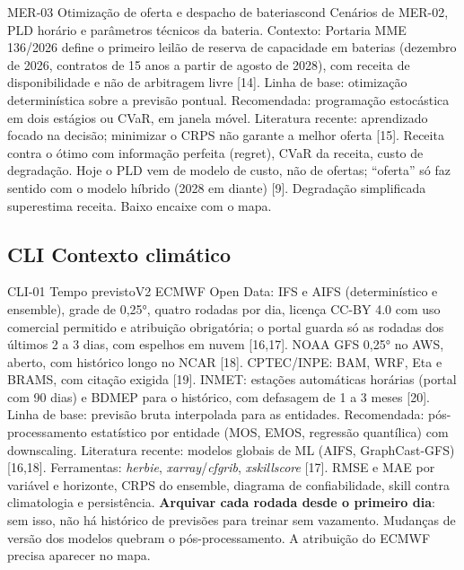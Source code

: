 \begin{ficha}{MER-03 \textperiodcentered{} Otimização de oferta e despacho de baterias}{cond}
 Cenários de MER-02, PLD horário e parâmetros técnicos da
bateria. Contexto: Portaria MME 136/2026 define o primeiro leilão de reserva
de capacidade em baterias (dezembro de 2026, contratos de 15 anos a partir
de agosto de 2028), com receita de disponibilidade e não de arbitragem livre
[14].
 Linha de base: otimização determinística sobre a previsão
pontual. Recomendada: programação estocástica em dois estágios ou CVaR,
em janela móvel. Literatura recente: aprendizado focado na decisão; minimizar o
CRPS não garante a melhor oferta [15].
 Receita contra o ótimo com informação perfeita (regret),
CVaR da receita, custo de degradação.
 Hoje o PLD vem de modelo de custo, não de ofertas; ``oferta''
só faz sentido com o modelo híbrido (2028 em diante) [9]. Degradação
simplificada superestima receita. Baixo encaixe com o mapa.
\end{ficha}

\subsection{CLI \textperiodcentered{} Contexto climático}

\begin{ficha}{CLI-01 \textperiodcentered{} Tempo previsto}{V2}
 ECMWF Open Data: IFS e AIFS (determinístico e ensemble), grade
de 0,25°, quatro rodadas por dia, licença CC-BY 4.0 com uso comercial
permitido e atribuição obrigatória; o portal guarda só as rodadas dos
últimos 2 a 3 dias, com espelhos em nuvem [16,17]. NOAA GFS 0,25° no AWS,
aberto, com histórico longo no NCAR [18]. CPTEC/INPE: BAM, WRF, Eta e BRAMS,
com citação exigida [19]. INMET: estações automáticas horárias (portal com
90 dias) e BDMEP para o histórico, com defasagem de 1 a 3 meses [20].
 Linha de base: previsão bruta interpolada para as
entidades. Recomendada: pós-processamento estatístico por entidade (MOS,
EMOS, regressão quantílica) com downscaling. Literatura recente: modelos globais
de ML (AIFS, GraphCast-GFS) [16,18]. Ferramentas: \emph{herbie},
\emph{xarray}/\emph{cfgrib}, \emph{xskillscore} [17].
 RMSE e MAE por variável e horizonte, CRPS do ensemble,
diagrama de confiabilidade, skill contra climatologia e persistência.
 \textbf{Arquivar cada rodada desde o primeiro dia}: sem
isso, não há histórico de previsões para treinar sem vazamento. Mudanças de
versão dos modelos quebram o pós-processamento. A atribuição do ECMWF precisa
aparecer no mapa.
\end{ficha}

